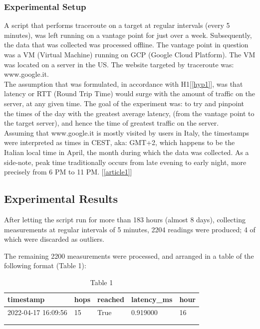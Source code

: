 \documentclass[a4paper,10pt]{article}
\begin{document}
\maketitle
\subsubsection{Experimental Setup}

A script that performs traceroute on a target at regular intervals (every 5 minutes), was left running on a vantage point for just over a week. Subsequently, the data that was collected was processed offline. The vantage point in question was a VM (Virtual Machine) running on GCP (Google Cloud Platform). The VM was located on a server in the US. The website targeted by traceroute was: www.google.it.\\

The assumption that was formulated, in accordance with H1[\ref{hyp1}], was that latency or RTT (Round Trip Time) would surge with the amount of traffic on the server, at any given time. The goal of the experiment was: to try and pinpoint the times of the day with the greatest average latency, (from the vantage point to the target server), and hence the time of greatest traffic on the server.\\

Assuming that www.google.it is mostly visited by users in Italy, the timestamps were interpreted as times in CEST, aka: GMT+2, which happens to be the Italian local time in April, the month during which the data was collected. As a side-note, peak time traditionally occurs from late evening to early night, more precisely from 6 PM to 11 PM. [\ref{article1}]\\


\subsection{Experimental Results}

After letting the script run for more than 183 hours (almost 8 days), collecting measurements at regular intervals of 5 minutes, 2204 readings were produced; 4 of which were discarded as outliers. 

The remaining 2200 measurements were processed, and arranged in a table of the following format (Table 1):


\begin{table}[h!]
\centering
\begin{tabular}{|l|l|l|l|l|}
\hline
timestamp           & hops & reached & latency\_ms & hour \\ \hline
2022-04-17 16:09:56 & 15   & True    & 0.919000    & 16   \\ \hline
                    &      &         &             &      \\ \hline
                    &      &         &             &     
\end{tabular}
\caption{Table 1}
\label{fig:table1}
\end{table}
\end{document}
